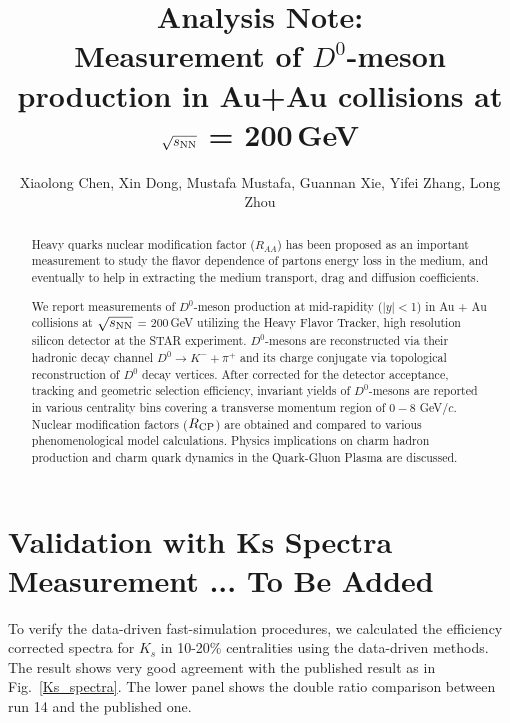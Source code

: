 \documentclass[a4paper]{article}
\title{Analysis Note: \\
Measurement of $D^0$-meson production in Au+Au collisions at $\sqrt{s_{\rm NN}}$ = 200\,GeV}
\author{Xiaolong Chen, Xin Dong, Mustafa Mustafa, Guannan Xie, Yifei Zhang, Long Zhou}
\begin{document}
\maketitle

\begin{abstract}

Heavy quarks nuclear modification factor ($R_{AA}$) has been proposed as an important measurement to study the flavor dependence of partons energy loss in the medium, and eventually to help in extracting the medium transport, drag and diffusion coefficients.


We report measurements of $D^0$-meson production at mid-rapidity ($|y|<$1) in Au + Au collisions at $\sqrt{s_{\rm NN}}$ = 200\,GeV utilizing the Heavy Flavor Tracker, high resolution silicon detector at the STAR experiment. $D^0$-mesons are reconstructed via their hadronic decay channel $D^0\rightarrow K^-+\pi^+$ and its charge conjugate via topological reconstruction of $D^0$ decay vertices. After corrected for the detector acceptance, tracking and geometric selection efficiency, invariant yields of $D^0$-mesons are reported in various centrality bins covering a transverse momentum region of $0-8$ GeV/$c$. Nuclear modification factors ($R_{\rm CP}$) are obtained and compared to various phenomenological model calculations. Physics implications on charm hadron production and charm quark dynamics in the Quark-Gluon Plasma are discussed.

\end{abstract}

\clearpage

\tableofcontents








\section{Validation with Ks Spectra Measurement ... To Be Added}
 To verify the data-driven fast-simulation procedures, we calculated the efficiency corrected spectra for $K_{s}$ in 10-20\% centralities using the data-driven methods. The result shows very good agreement with the published result as in Fig.~\ref{Ks_spectra}. The lower panel shows the double ratio comparison between run 14 and the published one.
\end{document}
